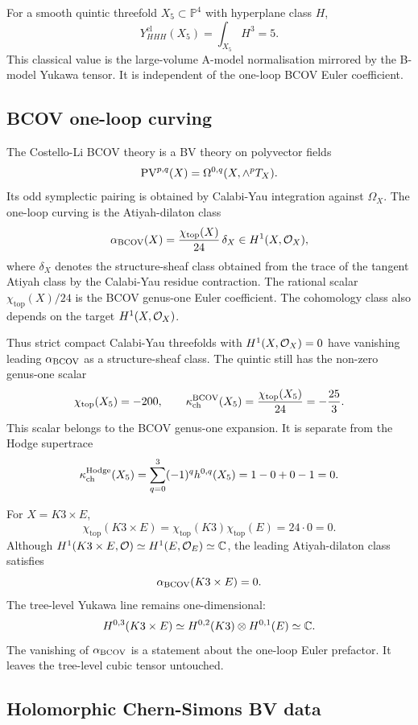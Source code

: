 For a smooth quintic threefold $X_5\subset\mathbb P^4$ with hyperplane
class $H$,
\[
Y_{HHH}^{\mathrm{cl}}(X_5)=\int_{X_5}H^3=5.
\]
This classical value is the large-volume A-model normalisation mirrored
by the B-model Yukawa tensor. It is independent of the one-loop BCOV
Euler coefficient.

\subsection*{BCOV one-loop curving}
\label{subsec:bcov-yukawa-alpha}

The Costello-Li BCOV theory is a BV theory on polyvector fields
\[
\mathrm{PV}^{p,q}(X)=\Omega^{0,q}(X,\wedge^pT_X).
\]
Its odd symplectic pairing is obtained by Calabi-Yau integration against
$\Omega_X$. The one-loop curving is the Atiyah-dilaton class
\[
\alpha_{\mathrm{BCOV}}(X)
=
\frac{\chi_{\mathrm{top}}(X)}{24}\,\delta_X
\in H^1(X,\mathcal{O}_X),
\]
where $\delta_X$ denotes the structure-sheaf class obtained from the
trace of the tangent Atiyah class by the Calabi-Yau residue contraction.
The rational scalar $\chi_{\mathrm{top}}(X)/24$ is the BCOV genus-one
Euler coefficient. The cohomology class also depends on the target
$H^1(X,\mathcal{O}_X)$.

Thus strict compact Calabi-Yau threefolds with $H^1(X,\mathcal{O}_X)=0$ have
vanishing leading $\alpha_{\mathrm{BCOV}}$ as a structure-sheaf class. The
quintic still has the non-zero genus-one scalar
\[
\chi_{\mathrm{top}}(X_5)=-200,\qquad
\kappa_{\mathrm{ch}}^{\mathrm{BCOV}}(X_5)=\frac{\chi_{\mathrm{top}}(X_5)}{24}=-\frac{25}{3}.
\]
This scalar belongs to the BCOV genus-one expansion. It is separate from
the Hodge supertrace
\[
\kappa_{\mathrm{ch}}^{\mathrm{Hodge}}(X_5)
=\sum_{q=0}^{3}(-1)^q h^{0,q}(X_5)
=1-0+0-1=0.
\]

For $X=K3\times E$,
\[
\chi_{\mathrm{top}}(K3\times E)=\chi_{\mathrm{top}}(K3)\chi_{\mathrm{top}}(E)
=24\cdot 0=0.
\]
Although $H^1(K3\times E,\mathcal{O})\simeq H^1(E,\mathcal{O}_E)\simeq\mathbb{C}$, the leading
Atiyah-dilaton class satisfies
\[
\alpha_{\mathrm{BCOV}}(K3\times E)=0.
\]
The tree-level Yukawa line remains one-dimensional:
\[
H^{0,3}(K3\times E)
\simeq H^{0,2}(K3)\otimes H^{0,1}(E)
\simeq \mathbb{C}.
\]
The vanishing of $\alpha_{\mathrm{BCOV}}$ is a statement about the one-loop
Euler prefactor. It leaves the tree-level cubic tensor untouched.

\subsection*{Holomorphic Chern-Simons BV data}
\label{subsec:bcov-yukawa-hcs}

